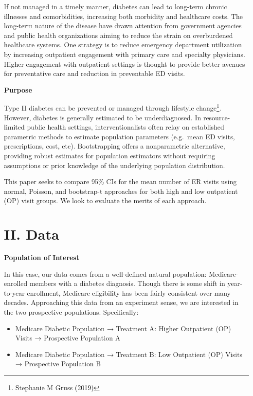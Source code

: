 \documentclass[
]{article}
\begin{document}
If not managed in a timely manner, diabetes can lead to long-term
chronic illnesses and comorbidities, increasing both morbidity and
healthcare costs. The long-term nature of the disease have drawn
attention from government agencies and public health organizations
aiming to reduce the strain on overburdened healthcare systems. One
strategy is to reduce emergency department utilization by increasing
outpatient engagement with primary care and specialty physicians. Higher
engagement with outpatient settings is thought to provide better avenues
for preventative care and reduction in preventable ED visits.

\textbf{Purpose}

Type II diabetes can be prevented or managed through lifestyle
change\footnote{Stephanie M Gruss (2019)}. However, diabetes is
generally estimated to be underdiagnosed. In resource-limited public
health settings, interventionalists often relay on established
parametric methods to estimate population parameters (e.g.~mean ED
visits, prescriptions, cost, etc). Bootstrapping offers a nonparametric
alternative, providing robust estimates for population estimators
without requiring assumptions or prior knowledge of the underlying
population distribution.

This paper seeks to compare 95\% CIs for the mean number of ER visits
using normal, Poisson, and bootstrap-t approaches for both high and low
outpatient (OP) visit groups. We look to evaluate the merits of each
approach.

\newpage

\section{II. Data}\label{ii.-data}

\textbf{Population of Interest}

In this case, our data comes from a well-defined natural population:
Medicare-enrolled members with a diabetes diagnosis. Though there is
some shift in year-to-year enrollment, Medicare eligibility has been
fairly consistent over many decades. Approaching this data from an
experiment sense, we are interested in the two prospective populations.
Specifically:

\begin{itemize}
\item
  Medicare Diabetic Population → Treatment A: Higher Outpatient (OP)
  Visits → Prospective Population A
\item
  Medicare Diabetic Population → Treatment B: Low Outpatient (OP) Visits
  → Prospective Population B
\end{itemize}
\end{document}
